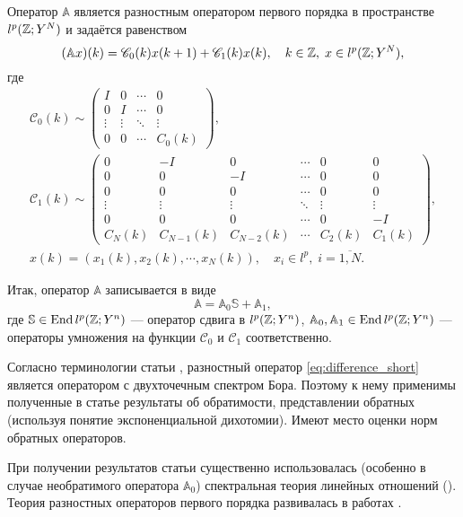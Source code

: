 Оператор $\mathbb A$ является разностным оператором первого порядка в пространстве $l^p(\mathbb{Z}; Y^N)$ и задаётся равенством
\begin{equation}\label{eq:difference_first_order}
(\mathbb A x)(k) = \mathcal C_0(k) x(k + 1) + \mathcal C_1(k) x(k) , \quad k \in \mathbb{Z}, \; x \in l^p(\mathbb{Z}; Y^N),
\end{equation}
где
\begin{gather*}
   \mathcal C_0(k) \sim \begin{pmatrix}
    I & 0 & \cdots &  0 \\
    0 & I  & \cdots &  0 \\
    \vdots & \vdots & \ddots &  \vdots \\
    0 & 0 & \cdots &  C_0(k)
   \end{pmatrix},\\
   \mathcal C_1(k) \sim \begin{pmatrix}
    0 & -I & 0  & \cdots & 0 & 0 \\
    0 & 0  & -I & \cdots & 0 & 0 \\
    0 & 0  & 0 & \cdots & 0 & 0 \\
    \vdots & \vdots & \vdots & \ddots & \vdots & \vdots \\
    0 & 0 & 0 & \cdots & 0 & -I \\
    C_N(k) & C_{N-1}(k) & C_{N-2}(k) & \cdots & C_2(k) & C_1(k)
   \end{pmatrix},\\[0.5em]
   x(k) = (x_1(k), x_2(k), \cdots, x_N(k)), \quad x_i \in l^p, \; i = \overline{1,N}.
\end{gather*}

Итак, оператор $\mathbb A$ записывается в виде
\begin{equation}\label{eq:difference_short}
    \mathbb A = \mathbb A_0 \mathbb S + \mathbb A_1,
\end{equation}
где $\mathbb S \in \operatorname{End} l^p(\mathbb{Z}; Y^n)$ --- оператор сдвига в $l^p(\mathbb{Z}; Y^n)$, $\mathbb A_0, \mathbb A_1 \in \operatorname{End} l^p(\mathbb{Z}; Y^n)$ --- операторы умножения на функции $\mathcal C_0$ и $\mathcal C_1$ соответственно.

Согласно терминологии статьи \cite{bohr2005}, разностный оператор \eqref{eq:difference_short} является оператором с двухточечным спектром Бора. Поэтому к нему применимы полученные в статье результаты об обратимости, представлении обратных (используя понятие экспоненциальной дихотомии). Имеют место оценки норм обратных операторов.

При получении результатов статьи \cite{bohr2005} существенно использовалась (особенно в случае необратимого оператора $\mathbb A_0$) спектральная теория линейных отношений (\cite{relations2002, relations2008}). Теория разностных операторов первого порядка развивалась в работах \cite{antonevich2,antonevich,kurbatov,kurbatov2,massera,henri,megan,dorogovtsev,chicone,inverse1992,memory2014,green2015,BasDup15,BasPas01,Bas00,Bas13,Bas15,Bic10,Bic13,Bic14}.

